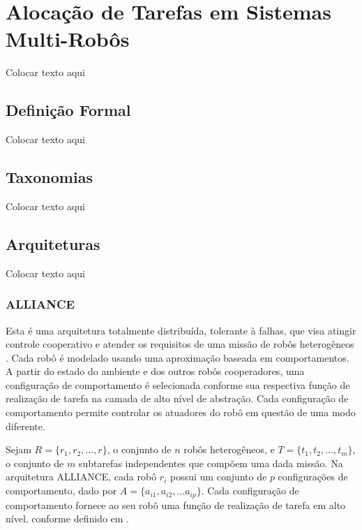 \chapter[Alocação de Tarefas em Sistemas Multi-Robôs]{Alocação de Tarefas em Sistemas Multi-Robôs} \label{cap:cap3}
Colocar texto aqui 

\section{Definição Formal} \label{sec:sec3_1}
Colocar texto aqui

\section{Taxonomias} \label{sec:sec3_2}
Colocar texto aqui

\section{Arquiteturas} \label{sec:sec3_3}
Colocar texto aqui

\subsection{ALLIANCE} \label{sub:sub3_3_1}

Esta é uma arquitetura totalmente distribuída, tolerante à falhas, que visa atingir controle cooperativo e atender os requisitos de uma missão de robôs heterogêneos \cite{ref:parker1998alliance}. Cada robô é modelado usando uma aproximação baseada em comportamentos. A partir do estado do ambiente e dos outros robôs cooperadores, uma configuração de comportamento é selecionada conforme sua respectiva função de realização de tarefa na camada de alto nível de abstração. Cada configuração de comportamento permite controlar os atuadores do robô em questão de uma modo diferente.

Sejam $R=\{r_1,r_2,...,r\}$, o conjunto de $n$ robôs heterogêneos, e $T=\{t_1,t_2,...,t_m\}$, o conjunto de $m$ subtarefas independentes que compõem uma dada missão. Na arquitetura ALLIANCE, cada robô $r_i$ possui um conjunto de $p$ configurações de comportamento, dado por $A=\{a_{i1},a_{i2},...a_{ip}\}$. Cada configuração de comportamento fornece ao seu robô uma função de realização de tarefa em alto nível, conforme definido em \cite{ref:brooks1986robust}. 

